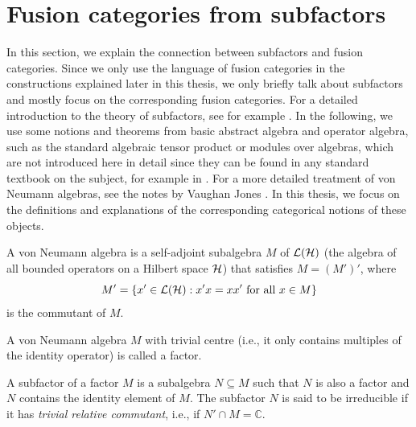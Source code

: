 \section{Fusion categories from subfactors}

In this section, we explain the connection between subfactors and fusion categories. Since we only use the language of fusion categories in the constructions explained later in this thesis, we only briefly talk about subfactors and mostly focus on the corresponding fusion categories. For a detailed introduction to the theory of subfactors, see for example \cite{Jones1997}. In the following, we use some notions and theorems from basic abstract algebra and operator algebra, such as the standard algebraic tensor product or modules over algebras, which are not introduced here in detail since they can be found in any standard textbook on the subject, for example in \cite{Jacobson2009a,Jacobson2009b}. For a more detailed treatment of von Neumann algebras, see the notes by Vaughan Jones \cite{JonesvNA}. In this thesis, we focus on the definitions and explanations of the corresponding categorical notions of these objects.

\begin{defn}
	A von Neumann algebra is a self-adjoint subalgebra $M$ of $\mathcal{L}({\mathcal{H}})$ (the algebra of all bounded operators on a Hilbert space ${\mathcal{H}}$) that satisfies $M=(M')'$, where
		\begin{equation}
			M'=\{x'\in\mathcal{L}({\mathcal{H}}):x'x=xx'\text{ for all }x\in M\}
		\end{equation}
	is the commutant of $M$.
\end{defn}

\begin{defn}[Factor]
	A von Neumann algebra $M$ with trivial centre (i.e., it only contains multiples of the identity operator) is called a factor. 
\end{defn}

\begin{defn}[Subfactor]
	A subfactor of a factor $M$ is a subalgebra $N\subseteq M$ such that $N$ is also a factor and $N$ contains the identity element of $M$. The subfactor $N$ is said to be irreducible if it has \emph{trivial relative commutant}, i.e., if $N'\cap M=\mathbb{C}$.
\end{defn}

